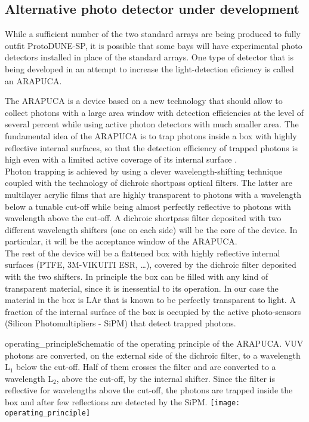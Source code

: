 
\subsection{Alternative photo detector under development}


While a sufficient number of the two standard arrays are being produced to
fully outfit ProtoDUNE-SP, it is possible that some bays will have 
experimental photo detectors installed in place of the standard arrays.  
One type of detector that is being developed in an attempt to increase the
light-detection eficiency is called an ARAPUCA.

The ARAPUCA is a device based on a new technology that should allow to collect photons with a large area window with detection efficiencies at the level of several percent 
while using active photon detectors with much smaller area.
The fundamental idea of the ARAPUCA is to trap photons inside a box with highly reflective internal surfaces, so that the detection efficiency of trapped photons is high even with a 
limited active coverage of its internal surface \cite{arapuca_jinst}.\\

Photon trapping is achieved by using a clever wavelength-shifting technique coupled with the technology of dichroic shortpass optical filters. The latter are multilayer acrylic films that are
highly transparent to photons with a wavelength below a tunable cut-off while being almost perfectly reflective to photons with wavelength above the cut-off. 
A dichroic shortpass filter deposited with two different wavelength shifters (one on each side) will be the core of the device. In particular, it will be the acceptance window of the 
ARAPUCA.\\
The rest of the device will be a flattened box with highly reflective internal surfaces (PTFE, 3M-VIKUITI ESR, \dots), covered by the 
dichroic filter deposited with the two shifters. In principle the box can be filled with any kind of transparent material, since it is inessential to its operation. In our case the material in the 
box is LAr that is known to be perfectly transparent to light.
A fraction of the internal surface of the box is occupied by the active photo-sensors (Silicon Photomultipliers - SiPM) that detect trapped photons.\\

\begin{cdrfigure}{operating_principle}{Schematic of the operating principle of the ARAPUCA. VUV photons are converted, on the external side of the dichroic filter, to a wavelength L$_1$ below the cut-off. Half of 
them crosses the filter and are converted to a wavelength L$_2$, above the cut-off, by the internal shifter. Since the filter is reflective for wavelengths above the cut-off, the photons are 
trapped inside the box and after few reflections are detected by the SiPM.}
\texttt{[image: operating\_principle]}
\end{cdrfigure}

